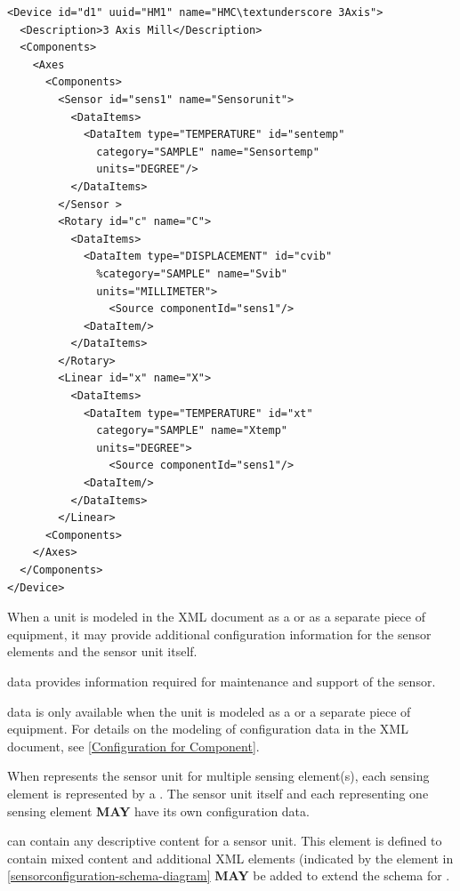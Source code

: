 \begin{lstlisting}[firstnumber=1,escapechar=|,%
    caption={Example of Sensor Unit with Sensing Element}, label={lst:example-of-sensor-with-sensing-elements}]
<Device id="d1" uuid="HM1" name="HMC\textunderscore 3Axis">
  <Description>3 Axis Mill</Description>
  <Components>
    <Axes
      <Components>
        <Sensor id="sens1" name="Sensorunit">
          <DataItems>
            <DataItem type="TEMPERATURE" id="sentemp"
              category="SAMPLE" name="Sensortemp" 
              units="DEGREE"/> 
          </DataItems>
        </Sensor >
        <Rotary id="c" name="C">
          <DataItems>
            <DataItem type="DISPLACEMENT" id="cvib"
              %category="SAMPLE" name="Svib" 
              units="MILLIMETER">
                <Source componentId="sens1"/>
            <DataItem/>
          </DataItems>
        </Rotary>
        <Linear id="x" name="X">
          <DataItems>
            <DataItem type="TEMPERATURE" id="xt" 
              category="SAMPLE" name="Xtemp" 
              units="DEGREE">
                <Source componentId="sens1"/>
            <DataItem/>
          </DataItems>
        </Linear>
      <Components>
    </Axes>
  </Components>
</Device>
\end{lstlisting}

When a  unit is modeled in the \gls{XML} document as a  or as a separate piece of equipment, it may provide additional configuration information for the \glspl{sensor element} and the \gls{sensor unit} itself.  

 data provides information required for maintenance and support of the sensor.

 data is only available when the  unit is modeled as a  or a separate piece of equipment. For details on the modeling of configuration data in the \gls{XML} document, see \ref{Configuration for Component}.

When  represents the \gls{sensor unit} for multiple \gls{sensing element}(s), each sensing element is represented by a .   The \gls{sensor unit} itself and each  representing one \gls{sensing element} \textbf{MAY} have its own configuration data.

 can contain any descriptive content for a \gls{sensor unit}.  This element is defined to contain mixed content and additional \gls{XML} elements (indicated by the  element in \ref{sensorconfiguration-schema-diagram} \textbf{MAY} be added to extend the schema for .



